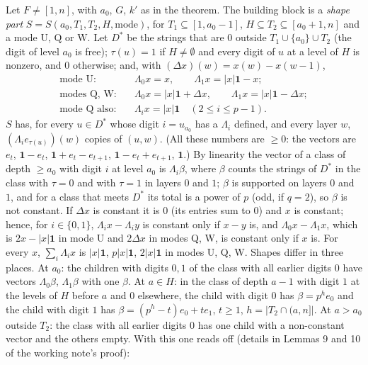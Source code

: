 \documentclass[11pt,a4paper]{amsart}
\theoremstyle{definition}
\theoremstyle{remark}
\newcommand{\one}{\mathbf{1}}
\begin{document}
Let $F\ne[1,n]$, with $a_0$, $G$, $k'$ as in the theorem. The building block is a \emph{shape part}
$S=S(a_0,T_1,T_2,H,\text{mode})$, for $T_1\subseteq[1,a_0-1]$, $H\subseteq T_2\subseteq[a_0+1,n]$ and a mode
$\mathrm U$, $\mathrm Q$ or $\mathrm W$. Let $D^*$ be the strings that are $0$ outside
$T_1\cup\{a_0\}\cup T_2$ (the digit of level $a_0$ is free); $\tau(u)=1$ if $H\ne\emptyset$ and every digit
of $u$ at a level of $H$ is nonzero, and $0$ otherwise; and, with $(\Delta x)(w)=x(w)-x(w-1)$,
\begin{align*}
\text{mode U:}\quad&\Lambda_0x=x,\qquad \Lambda_1x=|x|\one-x;\\
\text{modes Q, W:}\quad&\Lambda_0x=|x|\one+\Delta x,\qquad\Lambda_1x=|x|\one-\Delta x;\\
\text{mode Q also:}\quad&\Lambda_ix=|x|\one\quad(2\le i\le p-1).
\end{align*}
$S$ has, for every $u\in D^*$ whose digit $i=u_{a_0}$ has a $\Lambda_i$ defined, and every layer $w$,
$(\Lambda_ie_{\tau(u)})(w)$ copies of $(u,w)$. (All these numbers are $\ge0$: the vectors are $e_t$,
$\one-e_t$, $\one+e_t-e_{t+1}$, $\one-e_t+e_{t+1}$, $\one$.) By linearity the vector of a class of depth $\ge a_0$ with digit $i$ at level $a_0$ is $\Lambda_i\beta$, where $\beta$ counts the strings of $D^*$ in
the class with $\tau=0$ and with $\tau=1$ in layers $0$ and $1$; $\beta$ is supported on layers $0$ and $1$, and for a class that meets $D^*$ its total is a power of
$p$ (odd, if $q=2$), so $\beta$ is not constant. If $\Delta x$ is constant it is $0$ (its entries sum
to $0$) and $x$ is constant; hence, for $i\in\{0,1\}$, $\Lambda_ix-\Lambda_iy$ is constant only if
$x-y$ is, and $\Lambda_0x-\Lambda_1x$, which is $2x-|x|\one$ in mode U and $2\Delta x$ in modes Q, W,
is constant only if $x$ is. For every $x$, $\sum_i\Lambda_ix$ is $|x|\one$, $p|x|\one$, $2|x|\one$ in
modes U, Q, W. Shapes differ in three places. At $a_0$: the children with digits $0,1$ of the class
with all earlier digits $0$ have vectors $\Lambda_0\beta$, $\Lambda_1\beta$ with one $\beta$. At
$a\in H$: in the class of depth $a-1$ with digit $1$ at the levels of $H$ before $a$ and $0$ elsewhere,
the child with digit $0$ has $\beta=p^he_0$ and the child with digit $1$ has $\beta=(p^h-t)e_0+te_1$,
$t\ge1$, $h=|T_2\cap(a,n]|$. At $a>a_0$ outside $T_2$: the class with all earlier digits $0$ has one
child with a non-constant vector and the others empty. With this one reads off (details in Lemmas 9
and 10 of the working note's proof):
\end{document}
